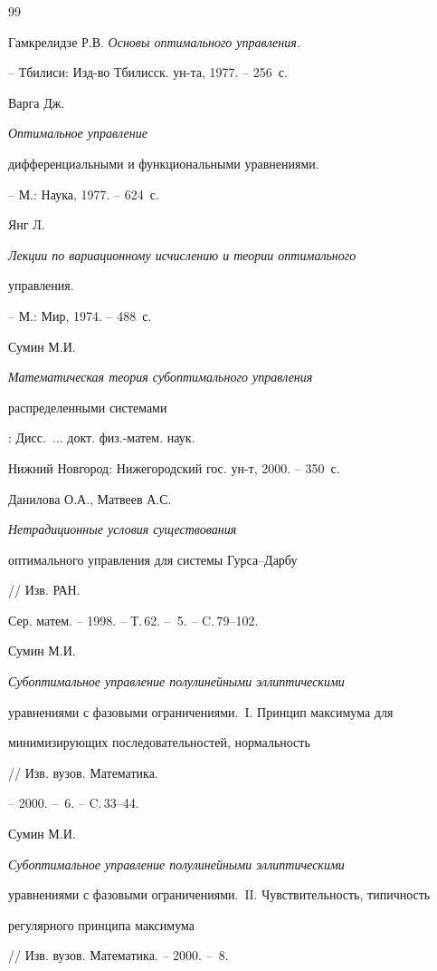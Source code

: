 \begin{thebibliography}{99}







Гамкрелидзе Р.В. {\it Основы оптимального управления.}


-- Тбилиси: Изд-во Тбилисск. ун-та, 1977. -- 256~с.




Варга Дж. {\it Оптимальное управление


дифференциальными и функциональными уравнениями.} -- М.: Наука, 1977.  -- 624~с.




Янг Л. {\it Лекции по вариационному исчислению и теории оптимального


управления.} -- М.: Мир, 1974.  -- 488~с.




Сумин М.И. {\it Математическая теория субоптимального управления


распределенными системами}\/: Дисс.~$\dotsc$ докт. физ.-матем. наук.


Нижний Новгород: Нижегородский гос. ун-т, 2000.  -- 350~с.




Данилова О.А., Матвеев А.С. {\it Нетрадиционные условия существования


оптимального управления для системы Гурса--Дарбу} // Изв. РАН.


Сер. матем. -- 1998. -- Т.\,62. -- \No\,5. -- C.\,79--102.




Сумин М.И. {\it Субоптимальное управление полулинейными эллиптическими


уравнениями с фазовыми ограничениями.~$\mathrm I$. Принцип максимума для


минимизирующих последовательностей, нормальность} // Изв. вузов. Математика.


-- 2000. -- \No\,6. -- C.\,33--44.




Сумин М.И. {\it Субоптимальное управление полулинейными эллиптическими


уравнениями с фазовыми ограничениями.~$\mathrm{II}$. Чувствительность, типичность


регулярного принципа максимума} // Изв. вузов. Математика. -- 2000. -- \No\,8.



\end{thebibliography}
